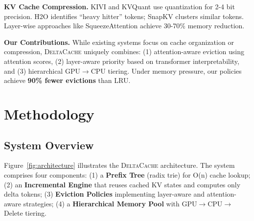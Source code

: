 \documentclass{article}
\newcommand{\deltacache}{\textsc{DeltaCache}}
\begin{document}
\textbf{KV Cache Compression.}
KIVI \citep{liu2024kivi} and KVQuant \citep{hooper2024kvquant} use quantization for 2-4 bit precision.
H2O \citep{zhang2024h2o} identifies ``heavy hitter'' tokens; SnapKV \citep{snapkv2024} clusters similar tokens.
Layer-wise approaches like SqueezeAttention \citep{squeezeattention2025} achieve 30-70\% memory reduction.

\textbf{Our Contributions.}
While existing systems focus on cache organization or compression, \deltacache{} uniquely combines: (1) attention-aware eviction using attention scores, (2) layer-aware priority based on transformer interpretability, and (3) hierarchical GPU$\rightarrow$CPU tiering.
Under memory pressure, our policies achieve \textbf{90\% fewer evictions} than LRU.

\section{Methodology}

\subsection{System Overview}

Figure~\ref{fig:architecture} illustrates the \deltacache{} architecture.
The system comprises four components:
(1) a \textbf{Prefix Tree} (radix trie) for O(n) cache lookup;
(2) an \textbf{Incremental Engine} that reuses cached KV states and computes only delta tokens;
(3) \textbf{Eviction Policies} implementing layer-aware and attention-aware strategies;
(4) a \textbf{Hierarchical Memory Pool} with GPU$\rightarrow$CPU$\rightarrow$Delete tiering.
\end{document}
